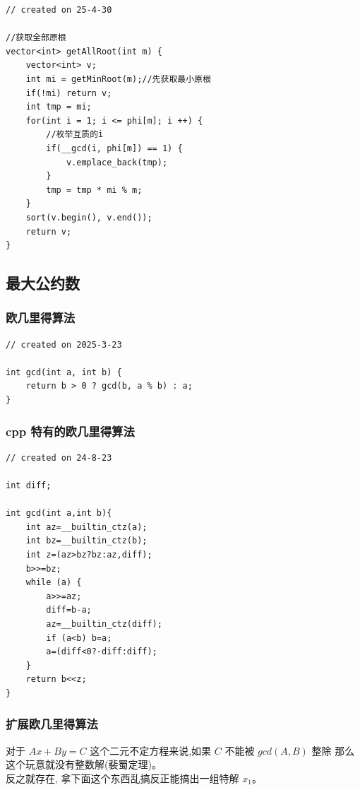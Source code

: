 \documentclass[a4paper,12pt]{article}
\begin{document}
\begin{lstlisting}
// created on 25-4-30

//获取全部原根
vector<int> getAllRoot(int m) {
    vector<int> v;
    int mi = getMinRoot(m);//先获取最小原根
    if(!mi) return v;
    int tmp = mi;
    for(int i = 1; i <= phi[m]; i ++) {
        //枚举互质的i
        if(__gcd(i, phi[m]) == 1) {
            v.emplace_back(tmp);
        }
        tmp = tmp * mi % m;
    }
    sort(v.begin(), v.end());
    return v;
}
\end{lstlisting}

\subsection{最大公约数}

\subsubsection{欧几里得算法}

\begin{lstlisting}
// created on 2025-3-23

int gcd(int a, int b) {
    return b > 0 ? gcd(b, a % b) : a;
}
\end{lstlisting}

\subsubsection{cpp 特有的欧几里得算法}

\begin{lstlisting}
// created on 24-8-23

int diff;

int gcd(int a,int b){
    int az=__builtin_ctz(a);
    int bz=__builtin_ctz(b);
    int z=(az>bz?bz:az,diff);
    b>>=bz;
    while (a) {
        a>>=az;
        diff=b-a;
        az=__builtin_ctz(diff);
        if (a<b) b=a;
        a=(diff<0?-diff:diff);
    }
    return b<<z;
}
\end{lstlisting}

\subsubsection{扩展欧几里得算法}

\noindent 对于 $Ax + By = C$ 这个二元不定方程来说,如果 $C$ 不能被 $gcd(A,B)$ 整除
那么这个玩意就没有整数解(裴蜀定理)。 \\ 

\noindent 反之就存在, 拿下面这个东西乱搞反正能搞出一组特解 $x_1$。 \\
\end{document}
